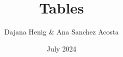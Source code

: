 \documentclass{article}
\begin{document}
\title{Tables}
\author{Dajana Henig \& Ana Sanchez Acosta }
\date{July 2024}

\maketitle
        
        
        
           
        
        
        
        
          
        
\end{document}
